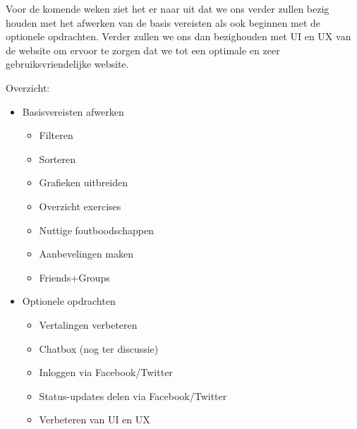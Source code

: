 Voor de komende weken ziet het er naar uit dat we ons verder zullen bezig houden met het afwerken van de basis 
vereisten als ook beginnen met de optionele opdrachten. Verder zullen we ons dan bezighouden met UI en UX van de
website om ervoor te zorgen dat we tot een optimale en zeer gebruiksvriendelijke website.

Overzicht:
\begin{itemize}
	\item Basisvereisten afwerken
	\begin{itemize}
		\item Filteren
		\item Sorteren
		\item Grafieken uitbreiden
		\item Overzicht exercises
		\item Nuttige foutboodschappen
		\item Aanbevelingen maken
		\item Friends+Groups
	\end{itemize}
	\item Optionele opdrachten
	\begin{itemize}
		\item Vertalingen verbeteren
		\item Chatbox (nog ter discussie)
		\item Inloggen via Facebook/Twitter
		\item Status-updates delen via Facebook/Twitter
		\item Verbeteren van UI en UX
	\end{itemize}
\end{itemize}

